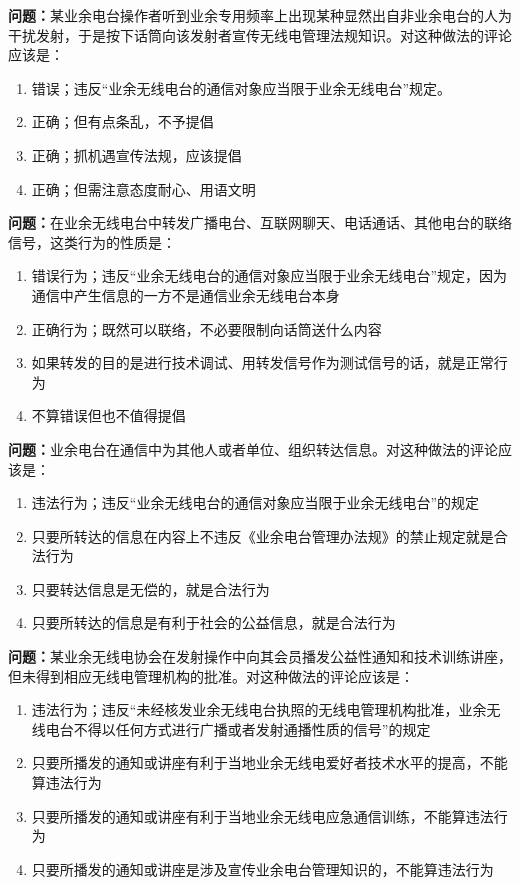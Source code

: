 \bigskip


\noindent\textbf{问题：}某业余电台操作者听到业余专用频率上出现某种显然出自非业余电台的人为干扰发射，于是按下话筒向该发射者宣传无线电管理法规知识。对这种做法的评论应该是：
\begin{enumerate}[label=\Alph*), leftmargin=3em]
\item 错误；违反“业余无线电台的通信对象应当限于业余无线电台”规定。
\item 正确；但有点条乱，不予提倡
\item 正确；抓机遇宣传法规，应该提倡
\item 正确；但需注意态度耐心、用语文明
\end{enumerate}

\bigskip


\noindent\textbf{问题：}在业余无线电台中转发广播电台、互联网聊天、电话通话、其他电台的联络信号，这类行为的性质是：
\begin{enumerate}[label=\Alph*), leftmargin=3em]
\item 错误行为；违反“业余无线电台的通信对象应当限于业余无线电台”规定，因为通信中产生信息的一方不是通信业余无线电台本身
\item 正确行为；既然可以联络，不必要限制向话筒送什么内容
\item 如果转发的目的是进行技术调试、用转发信号作为测试信号的话，就是正常行为
\item 不算错误但也不值得提倡
\end{enumerate}

\bigskip


\noindent\textbf{问题：}业余电台在通信中为其他人或者单位、组织转达信息。对这种做法的评论应该是：
\begin{enumerate}[label=\Alph*), leftmargin=3em]
\item 违法行为；违反“业余无线电台的通信对象应当限于业余无线电台”的规定
\item 只要所转达的信息在内容上不违反《业余电台管理办法规》的禁止规定就是合法行为
\item 只要转达信息是无偿的，就是合法行为
\item 只要所转达的信息是有利于社会的公益信息，就是合法行为
\end{enumerate}

\bigskip


\noindent\textbf{问题：}某业余无线电协会在发射操作中向其会员播发公益性通知和技术训练讲座，但未得到相应无线电管理机构的批准。对这种做法的评论应该是：
\begin{enumerate}[label=\Alph*), leftmargin=3em]
\item 违法行为；违反“未经核发业余无线电台执照的无线电管理机构批准，业余无线电台不得以任何方式进行广播或者发射通播性质的信号”的规定
\item 只要所播发的通知或讲座有利于当地业余无线电爱好者技术水平的提高，不能算违法行为
\item 只要所播发的通知或讲座有利于当地业余无线电应急通信训练，不能算违法行为
\item 只要所播发的通知或讲座是涉及宣传业余电台管理知识的，不能算违法行为
\end{enumerate}

